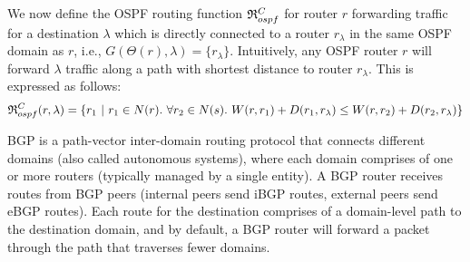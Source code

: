 

We now define the OSPF routing function $\mathfrak{R}_{ospf}^C$ for router $r$
forwarding traffic
for a destination $\lambda$ which is directly connected to a router $r_\lambda$ in the same OSPF domain as $r$, i.e., $G(\Theta(r),\lambda) = \{r_\lambda\}$. Intuitively, 
any OSPF router $r$ will forward $\lambda$ traffic along a path with
shortest distance to router $r_\lambda$. This is expressed as follows: 
\[
\mathfrak{R}_{ospf}^C(r,\lambda) = \{r_1 ~|~ r_1 \in N(r).~\forall r_2 \in N(s) .~W(r, r_1) + D(r_1, r_\lambda) \le 
W(r, r_2) + D(r_2, r_\lambda)\}
\]

 BGP is a path-vector inter-domain routing protocol
that connects different domains (also called autonomous systems), where each domain
comprises of one or more routers (typically managed by a single
entity). A BGP router receives routes from BGP peers (internal peers
send iBGP routes, external peers send eBGP routes). Each route for the
destination comprises of a domain-level path to the destination
domain, and by default, a BGP router will forward a packet through the path that traverses fewer domains.
 
